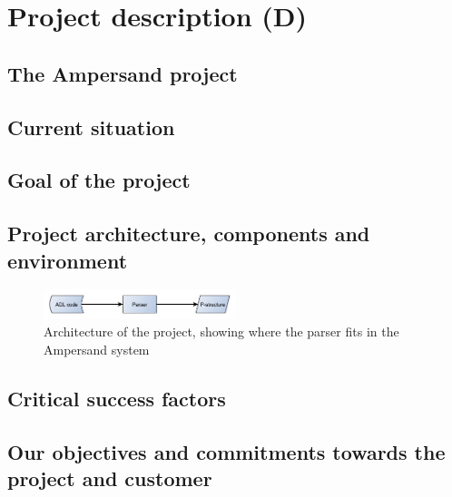 \section{Project description (D)}
\label{sec:project-description}

\subsection{The Ampersand project}

\subsection{Current situation}

\subsection{Goal of the project}

\subsection{Project architecture, components and environment}
\begin{figure}[hb]
  \centering
  \includegraphics[width=0.5\textwidth]{Figures/Architecture}
  \caption[Architecture of the project]{Architecture of the project, showing where the parser fits in the Ampersand system}
\end{figure}

\subsection{Critical success factors}

\subsection{Our objectives and commitments towards the project and customer}
